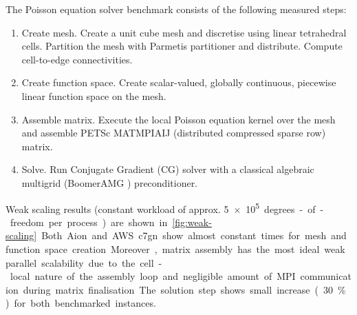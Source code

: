The Poisson equation solver benchmark consists of the following measured steps:
\begin{enumerate}
    \item Create mesh. Create a unit cube mesh and discretise using linear
    tetrahedral cells. Partition the mesh with Parmetis partitioner and
    distribute. Compute cell-to-edge connectivities.
    \item Create function space. Create scalar-valued, globally continuous,
    piecewise linear function space on the mesh.
    \item Assemble matrix. Execute the local Poisson equation kernel over the
    mesh and assemble PETSc MATMPIAIJ (distributed compressed sparse row)
    matrix.
    \item Solve. Run Conjugate Gradient (CG) solver with a classical algebraic
    multigrid (BoomerAMG \cite{hypre}) preconditioner.
\end{enumerate}
%
Weak scaling results (constant workload of approx. \SI{5e+5} degrees-of-freedom
per process) are shown in \autoref{fig:weak-scaling}. Both Aion and AWS c7gn show
almost constant times for mesh and function space creation. Moreover, matrix
assembly has the most ideal weak parallel scalability due to the cell-local
nature of the assembly loop and negligible amount of MPI communication during
matrix finalisation. The solution step shows small increase (30 \%) for both
benchmarked instances.

